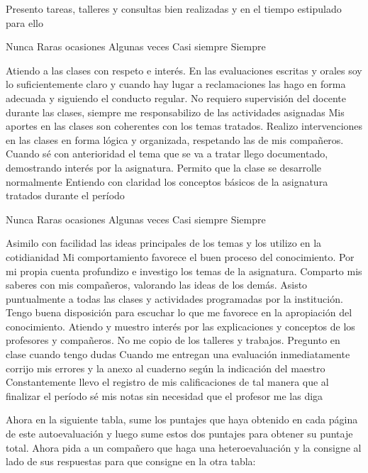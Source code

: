 \documentclass[10pt,addpoints]{exam}
\begin{document}
\begin{questions}
\question[5]
Presento tareas, talleres y consultas bien realizadas y en el tiempo estipulado para ello

\begin{oneparchoices}
\choice[1] Nunca
\choice[2] Raras ocasiones
\choice[3] Algunas veces
\choice[4] Casi siempre
\choice[5] Siempre 
\end{oneparchoices}
\answerline
\question[5]
Atiendo a las clases con respeto e interés.
\answerline
\question[5]
En las evaluaciones escritas y orales soy lo suficientemente claro y cuando hay lugar a reclamaciones las hago en forma adecuada y siguiendo el conducto regular.
\answerline
\question[5]
No requiero supervisión del docente durante las clases, siempre me responsabilizo de las actividades asignadas
\answerline
\question[5] Mis aportes en las clases son coherentes con los temas tratados.
\answerline
\question[5] Realizo intervenciones en las clases en forma lógica y organizada, respetando las de mis compañeros.
\answerline
\question[5] Cuando sé con anterioridad el tema que se va a tratar llego documentado, demostrando interés por la asignatura.
\answerline
\question[5] Permito que la clase se desarrolle normalmente
\answerline
\question[5] Entiendo con claridad los conceptos básicos de la asignatura tratados durante el período

\begin{oneparchoices}
\choice[1] Nunca
\choice[2] Raras ocasiones
\choice[3] Algunas veces
\choice[4] Casi siempre
\choice[5] Siempre 
\end{oneparchoices}
\answerline
\question[5] Asimilo con facilidad las ideas principales de los temas y los utilizo en la cotidianidad
\answerline
\question[5] Mi comportamiento favorece el buen proceso del conocimiento.
\answerline
\question[5] Por mi propia cuenta profundizo e investigo los temas de la asignatura.
\answerline
\question[5] Comparto mis saberes con mis compañeros, valorando las ideas de los demás.
\answerline
\question[5] Asisto puntualmente a todas las clases y actividades programadas por la institución.
\answerline
\question[5] Tengo buena disposición para escuchar lo que me favorece en la apropiación del conocimiento.
\answerline
\question[5] Atiendo y muestro interés por las explicaciones y conceptos de los profesores y compañeros.
\answerline
\question[5] No me copio de los talleres y trabajos.
\answerline
\question[5] Pregunto en clase cuando tengo dudas
\answerline
\question[5] Cuando me entregan una evaluación inmediatamente corrijo mis errores y la anexo al cuaderno según la indicación del maestro
\answerline
\question[5] Constantemente llevo el registro de mis calificaciones de tal manera que al finalizar el período sé mis notas sin necesidad que el profesor me las diga
\answerline
\end{questions}
Ahora en la siguiente tabla, sume los puntajes que haya obtenido en cada página de este autoevaluación y luego sume estos dos puntajes para obtener su puntaje total. Ahora pida a un compañero que haga una heteroevaluación y la consigne al lado de sus respuestas para que consigne en la otra tabla:
\end{document}
